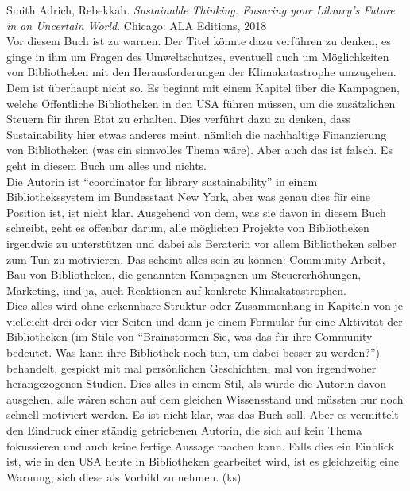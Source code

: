 \documentclass[a4paper,
fontsize=11pt,
oneside,
numbers=noperiodatend,
parskip=half-,
bibliography=totoc,
final
]{scrartcl}
\begin{document}
Smith Adrich, Rebekkah. \emph{Sustainable Thinking. Ensuring your
Library's Future in an Uncertain World}. Chicago: ALA Editions, 2018\\
Vor diesem Buch ist zu warnen. Der Titel könnte dazu verführen zu
denken, es ginge in ihm um Fragen des Umweltschutzes, eventuell auch um
Möglichkeiten von Bibliotheken mit den Herausforderungen der
Klimakatastrophe umzugehen. Dem ist überhaupt nicht so. Es beginnt mit
einem Kapitel über die Kampagnen, welche Öffentliche Bibliotheken in den
USA führen müssen, um die zusätzlichen Steuern für ihren Etat zu
erhalten. Dies verführt dazu zu denken, dass Sustainability hier etwas
anderes meint, nämlich die nachhaltige Finanzierung von Bibliotheken
(was ein sinnvolles Thema wäre). Aber auch das ist falsch. Es geht in
diesem Buch um alles und nichts.\\
Die Autorin ist ``coordinator for library sustainability'' in einem
Bibliothekssystem im Bundesstaat New York, aber was genau dies für eine
Position ist, ist nicht klar. Ausgehend von dem, was sie davon in diesem
Buch schreibt, geht es offenbar darum, alle möglichen Projekte von
Bibliotheken irgendwie zu unterstützen und dabei als Beraterin vor allem
Bibliotheken selber zum Tun zu motivieren. Das scheint alles sein zu
können: Community-Arbeit, Bau von Bibliotheken, die genannten Kampagnen
um Steuererhöhungen, Marketing, und ja, auch Reaktionen auf konkrete
Klimakatastrophen.\\
Dies alles wird ohne erkennbare Struktur oder Zusammenhang in Kapiteln
von je vielleicht drei oder vier Seiten und dann je einem Formular für
eine Aktivität der Bibliotheken (im Stile von ``Brainstormen Sie, was
das für ihre Community bedeutet. Was kann ihre Bibliothek noch tun, um
dabei besser zu werden?'') behandelt, gespickt mit mal persönlichen
Geschichten, mal von irgendwoher herangezogenen Studien. Dies alles in
einem Stil, als würde die Autorin davon ausgehen, alle wären schon auf
dem gleichen Wissensstand und müssten nur noch schnell motiviert werden.
Es ist nicht klar, was das Buch soll. Aber es vermittelt den Eindruck
einer ständig getriebenen Autorin, die sich auf kein Thema fokussieren
und auch keine fertige Aussage machen kann. Falls dies ein Einblick ist,
wie in den USA heute in Bibliotheken gearbeitet wird, ist es
gleichzeitig eine Warnung, sich diese als Vorbild zu nehmen. (ks)
\end{document}
